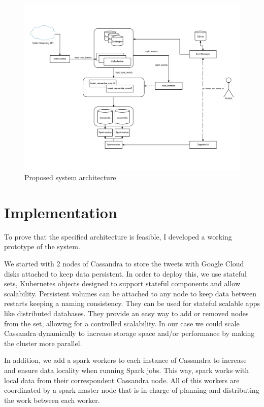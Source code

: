 \begin{figure}
\centering
\includegraphics[width=\textwidth]{Figures/SysArch}
\decoRule
\caption[System architecture]{Proposed system architecture}
\label{fig:SysArch}
\end{figure}

\section{Implementation}

To prove that the specified architecture is feasible, I developed a working prototype of the system. 

We started with 2 nodes of Cassandra to store the tweets with Google Cloud disks attached to keep data persistent. In order to deploy this, we use stateful sets, Kubernetes objects designed to support stateful components and allow scalability. Persistent volumes can be attached to any node to keep data between restarts keeping a naming consistency. They can be used for stateful scalable apps like distributed databases. They provide an easy way to add or removed nodes from the set, allowing for a controlled scalability. In our case we could scale Cassandra dynamically to increase storage space and/or performance by making the cluster more parallel.

In addition, we add a spark workers to each instance of Cassandra to increase and ensure data locality when running Spark jobs. This way, spark works with local data from their correspondent Cassandra node. All of this workers are coordinated by a spark master node that is in charge of planning and distributing the work between each worker.

